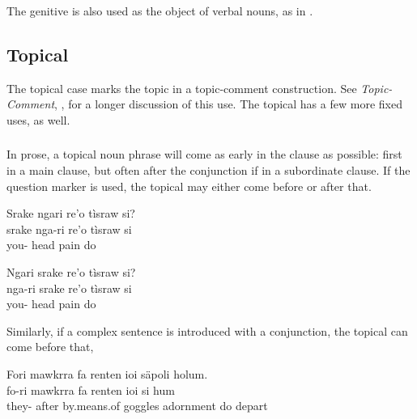 \subsubsection{} The genitive is also used as the object of verbal
nouns, as in  .

\subsection{Topical} The topical case marks the topic in a
topic-comment construction.  See \textit{Topic-Comment},
, for a longer discussion of this use.
The topical has a few more fixed uses, as well.

\subsubsection{} \label{syn!topical!word-order}
In prose, a topical noun phrase will come as early in the clause as
possible: first in a main clause, but often after the conjunction if
in a subordinate clause.  If the question marker  is used,
the topical may either come before or after that.

  \begin{interlin}
  \glll Srake ngari re'o tìsraw si? \\
     srake nga-ri re'o tìsraw si \\
      you- head pain do \\
  \end{interlin}

  \begin{interlin}
  \glll Ngari srake re'o tìsraw si? \\
     nga-ri srake re'o tìsraw si \\
     you-  head pain do \\
  \end{interlin}

\noindent Similarly, if a complex sentence is introduced with a
conjunction, the topical can come before that,

\begin{interlin}
\glll Fori mawkrra fa renten ioi säpoli holum. \\
      fo-ri mawkrra fa renten ioi si hum \\
      they- after by.means.of goggles adornment do depart\\
\end{interlin}

